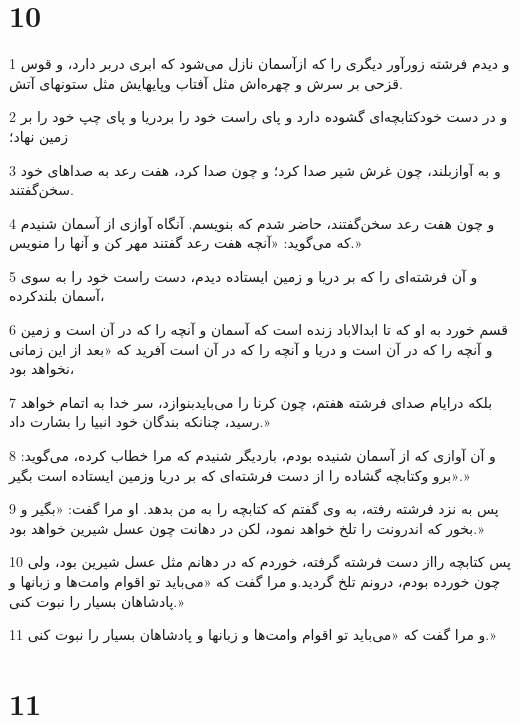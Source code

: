 \chapter{10}

\par 1 و دیدم فرشته زورآور دیگری را که ازآسمان نازل می‌شود که ابری دربر دارد، و قوس قزحی بر سرش و چهره‌اش مثل آفتاب وپایهایش مثل ستونهای آتش.
\par 2 و در دست خودکتابچه‌ای گشوده دارد و پای راست خود را بردریا و پای چپ خود را بر زمین نهاد؛
\par 3 و به آوازبلند، چون غرش شیر صدا کرد؛ و چون صدا کرد، هفت رعد به صداهای خود سخن‌گفتند.
\par 4 و چون هفت رعد سخن‌گفتند، حاضر شدم که بنویسم. آنگاه آوازی از آسمان شنیدم که می‌گوید: «آنچه هفت رعد گفتند مهر کن و آنها را منویس.»
\par 5 و آن فرشته‌ای را که بر دریا و زمین ایستاده دیدم، دست راست خود را به سوی آسمان بلندکرده،
\par 6 قسم خورد به او که تا ابدالاباد زنده است که آسمان و آنچه را که در آن است و زمین و آنچه را که در آن است و دریا و آنچه را که در آن است آفرید که «بعد از این زمانی نخواهد بود،
\par 7 بلکه درایام صدای فرشته هفتم، چون کرنا را می‌بایدبنوازد، سر خدا به اتمام خواهد رسید، چنانکه بندگان خود انبیا را بشارت داد.»
\par 8 و آن آوازی که از آسمان شنیده بودم، باردیگر شنیدم که مرا خطاب کرده، می‌گوید: «برو وکتابچه گشاده را از دست فرشته‌ای که بر دریا وزمین ایستاده است بگیر.»
\par 9 پس به نزد فرشته رفته، به وی گفتم که کتابچه را به من بدهد. او مرا گفت: «بگیر و بخور که اندرونت را تلخ خواهد نمود، لکن در دهانت چون عسل شیرین خواهد بود.»
\par 10 پس کتابچه رااز دست فرشته گرفته، خوردم که در دهانم مثل عسل شیرین بود، ولی چون خورده بودم، درونم تلخ گردید.و مرا گفت که «می‌باید تو اقوام وامت‌ها و زبانها و پادشاهان بسیار را نبوت کنی.»
\par 11 و مرا گفت که «می‌باید تو اقوام وامت‌ها و زبانها و پادشاهان بسیار را نبوت کنی.»

\chapter{11}

